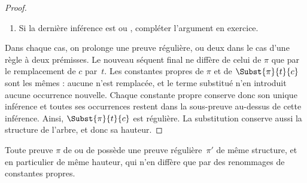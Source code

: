 \documentclass[../../../include/open-logic-section]{subfiles}
\begin{document}
\begin{proof}
\begin{enumerate}
    \item Si la dernière inférence est \RightR{\lexists}
    ou \LeftR{\lexists}, compléter l'argument en exercice.
  \end{enumerate}
  Dans chaque cas, on prolonge une preuve régulière,
  ou deux dans le cas d'une règle à deux prémisses.
  Le nouveau séquent final ne diffère de celui de $\pi$
  que par le remplacement de $c$ par~$t$.
  Les constantes propres de $\pi$ et de
  $\Subst{\pi}{t}{c}$ sont les mêmes :
  aucune n'est remplacée, et le terme substitué
  n'en introduit aucune occurrence nouvelle.
  Chaque constante propre conserve donc son unique
  inférence et toutes ses occurrences restent dans
  la sous-preuve au-dessus de cette inférence.
  Ainsi, $\Subst{\pi}{t}{c}$ est régulière.
  La substitution conserve aussi la structure de l'arbre,
  et donc sa hauteur.
\end{proof}

\begin{prop}
Toute preuve $\pi$ de  ou de 
possède une preuve régulière~$\pi'$ de même structure,
et en particulier de même hauteur, qui n'en diffère
que par des renommages de constantes propres.
\end{prop}
\end{document}
